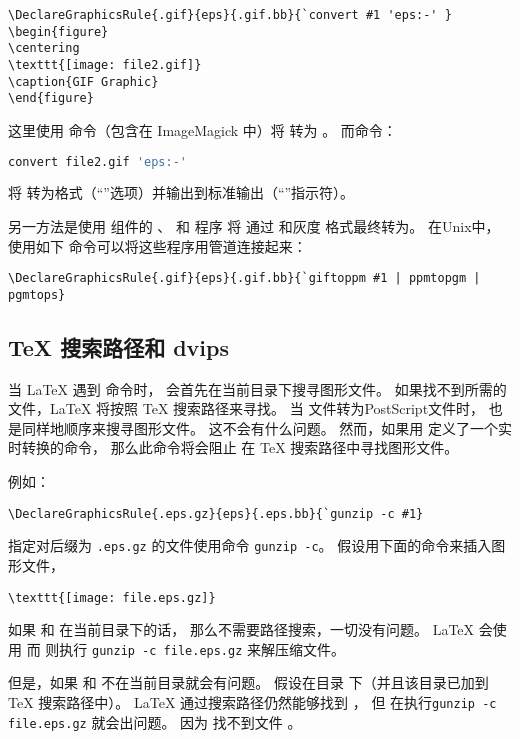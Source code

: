 \begin{lstlisting}
\DeclareGraphicsRule{.gif}{eps}{.gif.bb}{`convert #1 'eps:-' }
\begin{figure}
\centering
\texttt{[image: file2.gif]}
\caption{GIF Graphic}
\end{figure}
\end{lstlisting}
这里使用 命令（包含在 ImageMagick 中）将 转为 。
而命令：
\begin{lstlisting}[language=bash]
convert file2.gif 'eps:-'
\end{lstlisting}
将  转为格式（“”选项）并输出到标准输出（“\opt{-}”指示符）。

另一方法是使用  组件的 、 和  程序
将  通过  和灰度  格式最终转为。
在Unix中，使用如下  命令可以将这些程序用管道连接起来：
\begin{lstlisting}
\DeclareGraphicsRule{.gif}{eps}{.gif.bb}{`giftoppm #1 | ppmtopgm | pgmtops}
\end{lstlisting}


\subsection{\TeX{} 搜索路径和 dvips}\label{ssec:path-dvips}

当 \LaTeX{} 遇到 命令时，
会首先在当前目录下搜寻图形文件。
如果找不到所需的文件，\LaTeX{} 将按照 \TeX{} 搜索路径来寻找。
当  文件转为PostScript文件时， 也是同样地顺序来搜寻图形文件。
这不会有什么问题。
然而，如果用  定义了一个实时转换的命令，
那么此命令将会阻止  在 \TeX{} 搜索路径中寻找图形文件。

例如：
\begin{lstlisting}
\DeclareGraphicsRule{.eps.gz}{eps}{.eps.bb}{`gunzip -c #1}
\end{lstlisting}
指定对后缀为 \texttt{.eps.gz} 的文件使用命令 \texttt{gunzip -c}。
假设用下面的命令来插入图形文件，
\begin{lstlisting}
\texttt{[image: file.eps.gz]}
\end{lstlisting}
如果  和  在当前目录下的话，
那么不需要路径搜索，一切没有问题。
\LaTeX{} 会使用  而  则执行 
\verb|gunzip -c file.eps.gz| 来解压缩文件。

但是，如果  和  不在当前目录就会有问题。
假设在目录  下（并且该目录已加到 \TeX{} 搜索路径中）。
\LaTeX{} 通过搜索路径仍然能够找到 ，
但  在执行\verb|gunzip -c file.eps.gz| 就会出问题。
因为  找不到文件 。

